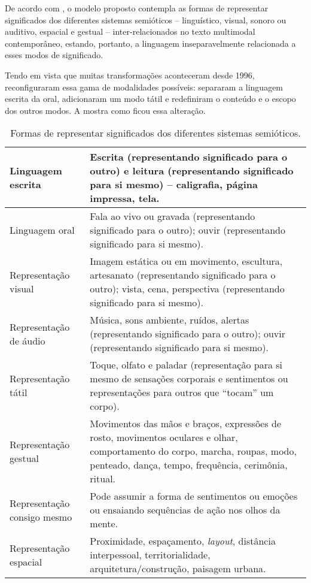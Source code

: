 \documentclass{textolivre}
\begin{document}
De acordo com \textcite{cope2009}, o modelo proposto contempla as formas de
representar significados dos diferentes sistemas semióticos – linguístico,
visual, sonoro ou auditivo, espacial e gestual – inter-relacionados no texto
multimodal contemporâneo, estando, portanto, a linguagem inseparavelmente
relacionada a esses modos de significado.

Tendo em vista que muitas transformações aconteceram desde 1996, \textcite{cope2009}
reconfiguraram essa gama de modalidades possíveis: separaram a
linguagem escrita da oral, adicionaram um modo tátil e redefiniram o conteúdo e
o escopo dos outros modos. A  mostra como ficou essa alteração.

\begin{table}[htpb]
\caption{Formas de representar significados dos diferentes sistemas semióticos.}
\label{tbl03}
\begin{tabular}{lp{8cm}}
\toprule
Linguagem escrita & Escrita (representando significado para o outro) e leitura (representando significado para si mesmo) – caligrafia, página impressa, tela. \\
\midrule
Linguagem oral & Fala ao vivo ou gravada (representando significado para o outro); ouvir (representando significado para si mesmo). \\
\midrule 
Representação visual & Imagem estática ou em movimento, escultura, artesanato (representando significado para o outro); vista, cena, perspectiva (representando significado para si mesmo). \\
\midrule
Representação de áudio & Música, sons ambiente, ruídos, alertas (representando significado para o outro); ouvir (representando significado para si mesmo). \\
\midrule
Representação tátil & Toque, olfato e paladar (representação para si mesmo de sensações corporais e sentimentos ou representações para outros que “tocam” um corpo). \\
\midrule
Representação gestual & Movimentos das mãos e braços, expressões de rosto, movimentos oculares e olhar, comportamento do corpo, marcha, roupas, modo, penteado, dança, tempo, frequência, cerimônia, ritual. \\
\midrule
Representação consigo mesmo & Pode assumir a forma de sentimentos ou emoções ou ensaiando sequências de ação nos olhos da mente. \\
\midrule
Representação espacial & Proximidade, espaçamento, \emph{layout}, distância interpessoal, territorialidade, arquitetura/construção, paisagem urbana. \\
\bottomrule
\end{tabular}
\end{table}
\end{document}
